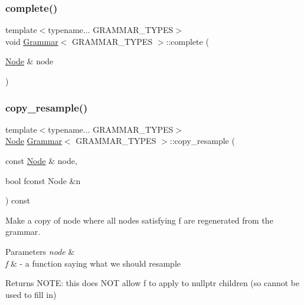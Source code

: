 \mbox{\label{class_grammar_a51a44e86d41c6e8a8ff7665208ac55da}} 
\subsubsection{\texorpdfstring{complete()}{complete()}}
{\footnotesize\ttfamily template$<$typename... G\+R\+A\+M\+M\+A\+R\+\_\+\+T\+Y\+P\+ES$>$ \\
void \hyperlink{class_grammar}{Grammar}$<$ G\+R\+A\+M\+M\+A\+R\+\_\+\+T\+Y\+P\+ES $>$\+::complete (\begin{DoxyParamCaption}\item[{\hyperlink{class_node}{Node} \&}]{node }\end{DoxyParamCaption})\hspace{0.3cm}{\ttfamily [inline]}}

\mbox{\label{class_grammar_a28b35de7e71ac8f451cd3a65818fc1db}} 
\subsubsection{\texorpdfstring{copy\+\_\+resample()}{copy\_resample()}}
{\footnotesize\ttfamily template$<$typename... G\+R\+A\+M\+M\+A\+R\+\_\+\+T\+Y\+P\+ES$>$ \\
\hyperlink{class_node}{Node} \hyperlink{class_grammar}{Grammar}$<$ G\+R\+A\+M\+M\+A\+R\+\_\+\+T\+Y\+P\+ES $>$\+::copy\+\_\+resample (\begin{DoxyParamCaption}\item[{const \hyperlink{class_node}{Node} \&}]{node,  }\item[{bool }]{fconst Node \&n }\end{DoxyParamCaption}) const\hspace{0.3cm}{\ttfamily [inline]}}

Make a copy of node where all nodes satisfying f are regenerated from the grammar. 
\begin{DoxyParams}{Parameters}
{\em node} & \\
\hline
{\em f} & -\/ a function saying what we should resample \\
\hline
\end{DoxyParams}
\begin{DoxyReturn}{Returns}
N\+O\+TE\+: this does N\+OT allow f to apply to nullptr children (so cannot be used to fill in)
\end{DoxyReturn}
\mbox{\label{class_grammar_a4aa05c747026932672a24fa1f7134115}} 
